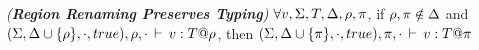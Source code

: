 \begin{lemma}
\emph{(\textbf{Region Renaming Preserves Typing})}
\label{thm:fb-renaming}
$\forall v, \Sigma, T, \Delta, \rho, \pi$, if $\rho,\pi \notin
\Delta$ and $(\Sigma,\Delta \cup \{\rho\},\cdot,true),
\rho, \cdot\,\vdash\,v:T@\rho$, then $(\Sigma,\Delta \cup \{\pi\}, 
\cdot,true),\pi, \cdot\,\vdash\,v:T@\pi$
\end{lemma}
